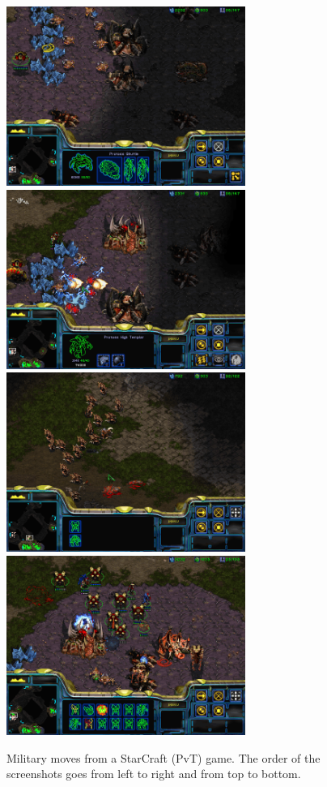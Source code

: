 \begin{figure}[!ht]
\begin{center}
\includegraphics[width=7.8cm]{images/SC_game/SC_drop2a.png}
\includegraphics[width=7.8cm]{images/SC_game/SC_drop2b.png}
\includegraphics[width=7.8cm]{images/SC_game/SC_dt_army.png}
\includegraphics[width=7.8cm]{images/SC_game/SC_final_attack.png}
\label{fig:SC_game2}
\caption{Military moves from a StarCraft (PvT) game. The order of the screenshots goes from left to right and from top to bottom.}
\end{center}
\end{figure}

